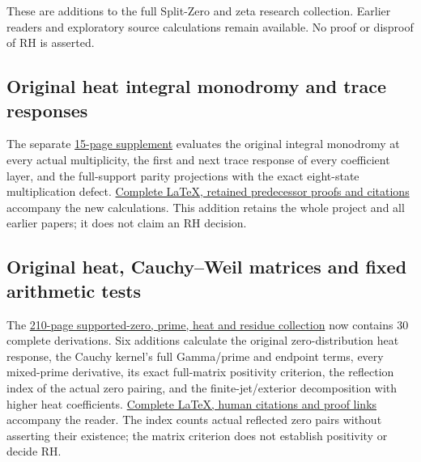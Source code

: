 \documentclass[
]{article}
\begin{document}
These are additions to the full Split-Zero and zeta research collection.
Earlier readers and exploratory source calculations remain available. No
proof or disproof of RH is asserted.

\subsection{Original heat integral monodromy and trace
responses}\label{original-heat-integral-monodromy-and-trace-responses}

The separate
\href{https://github.com/KokunoYumeto/zeta-function-research-reader/blob/main/workbenches/splitzero-tandem/continuations/20260923-original-heat-integral-monodromy/ORIGINAL_HEAT_MONODROMY_AND_TRACE_RESPONSES.pdf}{15-page
supplement} evaluates the original integral monodromy at every actual
multiplicity, the first and next trace response of every coefficient
layer, and the full-support parity projections with the exact
eight-state multiplication defect.
\href{https://github.com/KokunoYumeto/zeta-function-research-reader/blob/main/workbenches/splitzero-tandem/continuations/20260923-original-heat-integral-monodromy/README.md}{Complete
LaTeX, retained predecessor proofs and citations} accompany the new
calculations. This addition retains the whole project and all earlier
papers; it does not claim an RH decision.

\subsection{Original heat, Cauchy--Weil matrices and fixed arithmetic
tests}\label{original-heat-cauchyweil-matrices-and-fixed-arithmetic-tests}

The
\href{https://github.com/KokunoYumeto/zeta-function-research-reader/blob/main/workbenches/splitzero-tandem/branches/tau-zero-prime-positivity/TAU_ZERO_PRIME_POSITIVITY.pdf}{210-page
supported-zero, prime, heat and residue collection} now contains 30
complete derivations. Six additions calculate the original
zero-distribution heat response, the Cauchy kernel's full Gamma/prime
and endpoint terms, every mixed-prime derivative, its exact full-matrix
positivity criterion, the reflection index of the actual zero pairing,
and the finite-jet/exterior decomposition with higher heat coefficients.
\href{https://github.com/KokunoYumeto/zeta-function-research-reader/blob/main/workbenches/splitzero-tandem/branches/tau-zero-prime-positivity/PUBLICATION_COMPANION.md}{Complete
LaTeX, human citations and proof links} accompany the reader. The index
counts actual reflected zero pairs without asserting their existence;
the matrix criterion does not establish positivity or decide RH.
\end{document}
